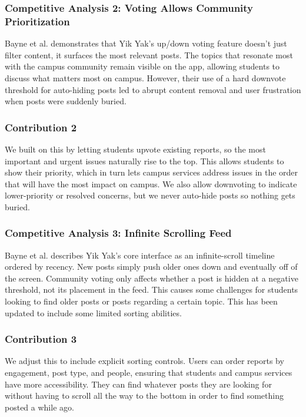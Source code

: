 \documentclass{article}
\begin{document}
\subsubsection*{Competitive Analysis 2: Voting Allows Community Prioritization}

Bayne et al. demonstrates that Yik Yak’s up/down voting feature doesn’t just filter content, it surfaces the most relevant posts. The topics that resonate most with the campus community remain visible on the app, allowing students to discuss what matters most on campus. However, their use of a hard downvote threshold for auto-hiding posts led to abrupt content removal and user frustration when posts were suddenly buried.

\subsubsection*{Contribution 2}
We built on this by letting students upvote existing reports, so the most important and urgent issues naturally rise to the top. This allows students to show their priority, which in turn lets campus services address issues in the order that will have the most impact on campus. We also allow downvoting to indicate lower-priority or resolved concerns, but we never auto-hide posts so nothing gets buried. 


\subsubsection*{Competitive Analysis 3: Infinite Scrolling Feed}

Bayne et al. describes Yik Yak’s core interface as an infinite-scroll timeline ordered by recency. New posts simply push older ones down and eventually off of the screen. Community voting only affects whether a post is hidden at a negative threshold, not its placement in the feed. This causes some challenges for students looking to find older posts or posts regarding a certain topic. This has been updated to include some limited sorting abilities. 


\subsubsection*{Contribution 3}
We adjust this to include explicit sorting controls. Users can order reports by engagement, post type, and people, ensuring that students and campus services have more accessibility.  They can find whatever posts they are looking for without having to scroll all the way to the bottom in order to find something posted a while ago. 
\end{document}
